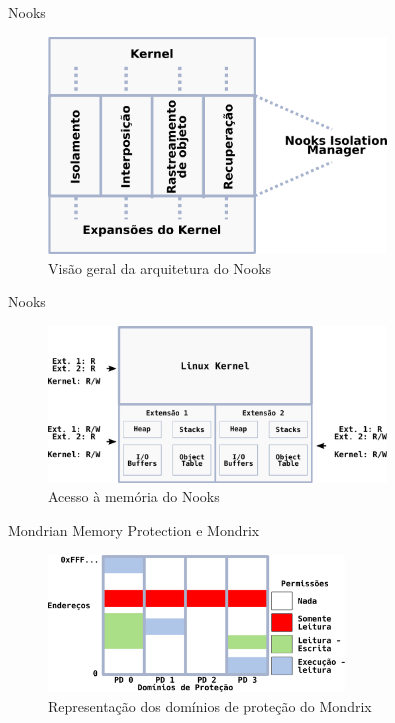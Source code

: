\documentclass[xcolor={usenames,svgnames,dvipsnames},brazil,english,12pt,aspectratio=149]{beamer}
\begin{document}
\begin{frame}{Nooks}
	\begin{figure}[!h]
		\centering
		\includegraphics[width=0.8\textwidth]{nooks_nim}
		\caption[Visão geral da arquitetura do Nooks]{Visão geral da arquitetura do Nooks}
		\label{fig:nooks_nim}
	\end{figure}
\end{frame}

\begin{frame}{Nooks}
	\begin{figure}[!h]
		\centering
		\includegraphics[width=0.8\textwidth]{nooks_mem}
		\caption[Acesso à memória do Nooks]{Acesso à memória do Nooks}
		\label{fig:nooks_mem}
	\end{figure}
\end{frame}

\begin{frame}{Mondrian Memory Protection e Mondrix}
	\begin{figure}[!h]
		\centering
		\includegraphics[width=0.7\textwidth]{mondrix_pd}
		\caption{Representação dos domínios de proteção do Mondrix}
		\label{fig:mondrixPD} 
	\end{figure}
\end{frame}
\end{document}
